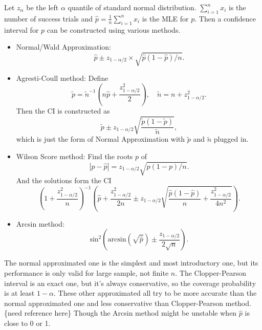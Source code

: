 \documentclass[a4paper,12pt]{article}
\begin{document}
Let $z_\alpha$ be the left $\alpha$ quantile of standard normal distribution. $\sum\limits_{i = 1}^nx_i$ is the number of success trials and $\hat{p} = \frac{1}{n}\sum\limits_{i = 1}^nx_i$ is the MLE for $p$. Then a confidence interval for $p$ can be constructed using various methods.
\begin{itemize}
\item Normal/Wald Approximation:
  \[
    \hat{p} \pm z_{1 - \alpha / 2}\times \sqrt{\hat{p}\left(1 - \hat{p}\right) / n}
    .
  \]
\item Agresti-Coull method: Define
  \[
    \tilde{p} = \tilde{n}^{-1}
    \left(
      n\hat{p} + \frac{z_{1 - \alpha / 2}^2}{2}
    \right)
    ,\quad
    \tilde{n} = n + z^2_{1 - \alpha / 2}
    .
  \]
  Then the CI is constructed as
  \[
    \tilde{p} \pm z_{1 - \alpha / 2}\sqrt{
      \frac{\tilde{p}\left(1 - \tilde{p}\right)}{\tilde{n}}
    }
    ,
  \]
  which is just the form of Normal Approximation with $\tilde{p}$ and $\tilde{n}$ plugged in.
\item Wilson Score method: Find the roots $p$ of
  \[
    \left|p - \hat{p}\right|
    = z_{1 - \alpha / 2}\sqrt{p\left(1 - p\right) / n}
    .
  \]
  And the solutions form the CI
  \[
    \left(1 + \frac{z_{1 - \alpha / 2}^2}{n}\right)^{-1}
    \left(
      \hat{p} + \frac{z_{1 - \alpha / 2}^2}{2n}
      \pm
      z_{1 - \alpha / 2}\sqrt{
        \frac{\hat{p}\left(1 - \hat{p}\right)}{n}
        + \frac{z_{1 - \alpha / 2}^2}{4n^2}
      }
    \right)
    .
  \]
\item Arcsin method:
  \[
    \mathrm{sin}^2\left(
      \mathrm{arcsin}\left(\sqrt{\hat{p}}\right) \pm \frac{z_{1 - \alpha / 2}}{2\sqrt{n}}
    \right)
    .
  \]
\end{itemize}

The normal approximated one is the simplest and most introductory one, but its performance is only valid for large sample, not finite $n$. The Clopper-Pearson interval is an exact one, but it's always conservative, so the coverage probability is at least $1 - \alpha$. These other approximated all try to be more accurate than the normal approximated one and less conservative than Clopper-Pearson method. {\color{blue}\{need reference here\} Though the Arcsin method might be unstable when $\hat{p}$ is close to 0 or 1.}





\end{document}

